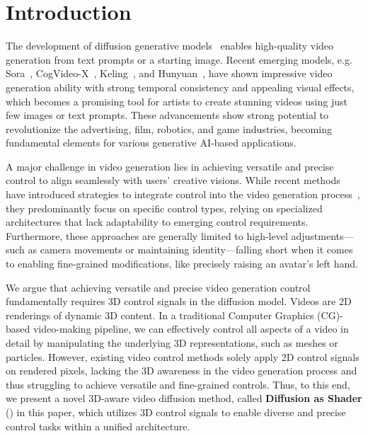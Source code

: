 \vspace{-12pt}
\section{Introduction}

The development of diffusion generative models~\cite{rombach2022high,ho2020denoising,blattmann2023stable,brooks2024video,lin2024open,opensora} enables high-quality video generation from text prompts or a starting image. Recent emerging models, e.g. Sora~\cite{brooks2024video}, CogVideo-X~\cite{yang2024cogvideox}, Keling~\cite{keling}, and Hunyuan~\cite{kong2024hunyuanvideo}, have shown impressive video generation ability with strong temporal consistency and appealing visual effects, which becomes a promising tool for artists to create stunning videos using just few images or text prompts. These advancements show strong potential to revolutionize the advertising, film, robotics, and game industries, becoming fundamental elements for various generative AI-based applications.

A major challenge in video generation lies in achieving versatile and precise control to align seamlessly with users' creative visions. While recent methods have introduced strategies to integrate control into the video generation process~\cite{wang2024motionctrl,he2024cameractrl,polyak2024movie,he2024id,yuan2024identity,wang2024boximator,huang2023fine,guo2024sparsectrl,namekata2024sg,ma2024trailblazer,ma2024follow}, they predominantly focus on specific control types, relying on specialized architectures that lack adaptability to emerging control requirements. Furthermore, these approaches are generally limited to high-level adjustments—such as camera movements or maintaining identity—falling short when it comes to enabling fine-grained modifications, like precisely raising an avatar's left hand.

We argue that achieving versatile and precise video generation control fundamentally requires 3D control signals in the diffusion model. 
Videos are 2D renderings of dynamic 3D content. 
In a traditional Computer Graphics (CG)- based video-making pipeline, we can effectively control all aspects of a video in detail by manipulating the underlying 3D representations, such as meshes or particles. 
However, existing video control methods solely apply 2D control signals on rendered pixels, lacking the 3D awareness in the video generation process and thus struggling to achieve versatile and fine-grained controls.
Thus, to this end, we present a novel 3D-aware video diffusion method, called \textbf{Diffusion as Shader} (\methodname) in this paper, which utilizes 3D control signals to enable diverse and precise control tasks within a unified architecture. 

